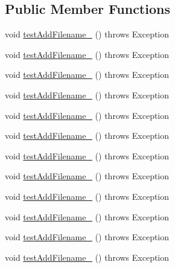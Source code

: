 \subsection*{Public Member Functions}
\begin{DoxyCompactItemize}
\item 
void \hyperlink{classorg_1_1jgap_1_1util_1_1_file_kit_test_a49e79d1a89d09a220f4ebd500ee8eead}{test\-Add\-Filename\-\_} ()  throws Exception 
\item 
void \hyperlink{classorg_1_1jgap_1_1util_1_1_file_kit_test_aad7f0a3d361d726888831aa744274f5c}{test\-Add\-Filename\-\_} ()  throws Exception 
\item 
void \hyperlink{classorg_1_1jgap_1_1util_1_1_file_kit_test_aaea5f568958430c0c4bc91f4627a6887}{test\-Add\-Filename\-\_} ()  throws Exception 
\item 
void \hyperlink{classorg_1_1jgap_1_1util_1_1_file_kit_test_a1af27745561f1e76b4db4bf5453cb0f5}{test\-Add\-Filename\-\_} ()  throws Exception 
\item 
void \hyperlink{classorg_1_1jgap_1_1util_1_1_file_kit_test_a12f6099f3a0f2d2451cc6432871d2b9d}{test\-Add\-Filename\-\_} ()  throws Exception 
\item 
void \hyperlink{classorg_1_1jgap_1_1util_1_1_file_kit_test_a206c12d9721cf97c4bb6b05453d1470f}{test\-Add\-Filename\-\_} ()  throws Exception 
\item 
void \hyperlink{classorg_1_1jgap_1_1util_1_1_file_kit_test_a4535684651f4aa54d7fedbfc448c16c0}{test\-Add\-Filename\-\_} ()  throws Exception 
\item 
void \hyperlink{classorg_1_1jgap_1_1util_1_1_file_kit_test_aa3886f03bdadf7583d5399adedd31b85}{test\-Add\-Filename\-\_} ()  throws Exception 
\item 
void \hyperlink{classorg_1_1jgap_1_1util_1_1_file_kit_test_a471601dedda6a68a68a310bf9ac42471}{test\-Add\-Filename\-\_} ()  throws Exception 
\item 
void \hyperlink{classorg_1_1jgap_1_1util_1_1_file_kit_test_a6a7c470518dfd218fc090129c04eae02}{test\-Add\-Filename\-\_} ()  throws Exception 
\item 
void \hyperlink{classorg_1_1jgap_1_1util_1_1_file_kit_test_a5671194a08d529933bb7e4e36e185ac3}{test\-Add\-Filename\-\_} ()  throws Exception 
\item 
void \hyperlink{classorg_1_1jgap_1_1util_1_1_file_kit_test_a73e4673c7bd4a0cf128e59d0eba7e6ca}{test\-Add\-Filename\-\_} ()  throws Exception 
\end{DoxyCompactItemize}
